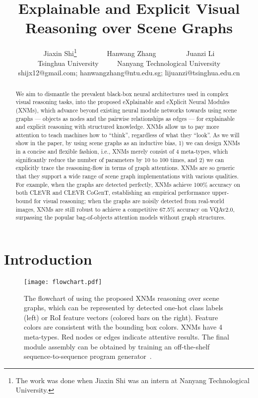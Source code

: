 \documentclass[10pt,twocolumn,letterpaper]{article}
\begin{document}
\title{Explainable and Explicit Visual Reasoning over Scene Graphs}

\author{Jiaxin Shi\protect \thanks{The work was done when Jiaxin Shi was an intern at Nanyang Technological University.} ~~~~~~~~Hanwang Zhang   ~~~~~~~~Juanzi Li\\
Tsinghua University ~~~~
Nanyang Technological University \\
shijx12@gmail.com; hanwangzhang@ntu.edu.sg; lijuanzi@tsinghua.edu.cn
}

\maketitle


\begin{abstract}
We aim to dismantle the prevalent black-box neural architectures used in complex visual reasoning tasks, into the proposed eXplainable and eXplicit Neural Modules (XNMs), which advance beyond existing neural module networks towards using scene graphs --- objects as nodes and the pairwise relationships as edges --- for explainable and explicit reasoning with structured knowledge. XNMs allow us to pay more attention to teach machines how to ``think'', regardless of what they ``look''. As we will show in the paper, by using scene graphs as an inductive bias, 1) we can design XNMs in a concise and flexible fashion, i.e., XNMs merely consist of 4 meta-types, which significantly reduce the number of parameters by 10 to 100 times, and 2) we can explicitly trace the reasoning-flow in terms of graph attentions. XNMs are so generic that they support a wide range of scene graph implementations with various qualities. For example, when the graphs are detected perfectly, XNMs achieve 100\% accuracy on both CLEVR and CLEVR CoGenT, establishing an empirical performance upper-bound for visual reasoning; when the graphs are noisily detected from real-world images, XNMs are still robust to achieve a competitive 67.5\% accuracy on VQAv2.0, surpassing the popular bag-of-objects attention models without graph structures. 
\end{abstract}



\vspace{-0.4cm}
\section{Introduction}
\begin{figure}[t]
\texttt{[image: flowchart.pdf]}
\caption{The flowchart of using the proposed XNMs reasoning over scene graphs, which can be represented by detected one-hot class labels (left) or RoI feature vectors (colored bars on the right). Feature colors are consistent with the bounding box colors. XNMs have 4 meta-types. Red nodes or edges indicate attentive results. The final module assembly can be obtained by training an off-the-shelf sequence-to-sequence program generator~\cite{johnson2017inferring}.}
\label{fig:1}
\vspace{-0.5cm}
\end{figure}
\end{document}
